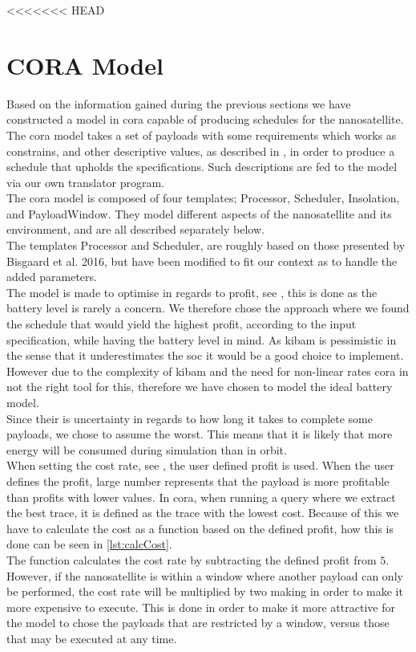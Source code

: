 <<<<<<< HEAD
\section{CORA Model} \label{sec:cora}
Based on the information gained during the previous sections we have constructed a model in \gls{cora} capable of producing schedules for the nanosatellite.
The \gls{cora} model takes a set of payloads with some requirements which works as constrains, and other descriptive values, as described in , in order to produce a schedule that upholds the specifications.
Such descriptions are fed to the model via our own translator program.\\
The \gls{cora} model is composed of four templates; Processor, Scheduler, Insolation, and PayloadWindow.
They model different aspects of the nanosatellite and its environment, and are all described separately below.\\
The templates Processor and Scheduler, are roughly based on those presented by Bisgaard et al. 2016\cite{gomx3}, but have been modified to fit our context as to handle the added parameters.\\
The model is made to optimise in regards to profit, see , this is done as the battery level is rarely a concern\cite{gom_space_conversation}.
We therefore chose the approach where we found the schedule that would yield the highest profit, according to the input specification, while having the battery level in mind.
As \gls{kibam} is pessimistic in the sense that it underestimates the \gls{soc} it would be a good choice to implement.
However due to the complexity of \gls{kibam} and the need for non-linear rates \gls{cora} in not the right tool for this, therefore we have chosen to model the ideal battery model.\\
Since their is uncertainty in regards to how long it takes to complete some payloads, we chose to assume the worst.
This means that it is likely that more energy will be consumed during simulation than in orbit.\\
When setting the cost rate, see , the user defined profit is used.
When the user defines the profit, large number represents that the payload is more profitable than profits with lower values.
In \gls{cora}, when running a query where we extract the best trace, it is defined as the trace with the lowest cost.
Because of this we have to calculate the cost as a function based on the defined profit, how this is done can be seen in \cref{lst:calcCost}.\\
The function  calculates the cost rate by subtracting the defined profit from $5$.
However, if the nanosatellite is within a window where another payload can only be performed, the cost rate will be multiplied by two making in order to make it more expensive to execute. 
This is done in order to make it more attractive for the model to chose the payloads that are restricted by a window, versus those that may be executed at any time.

